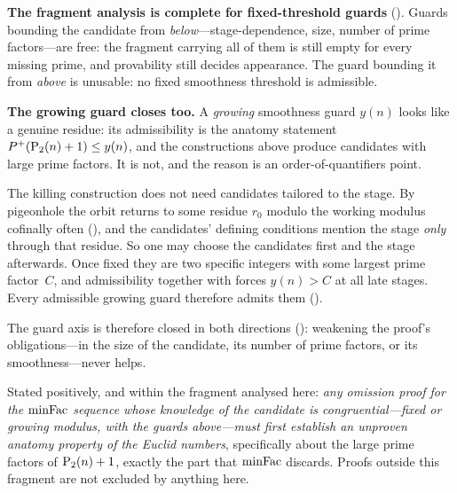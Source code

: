\begin{keyresult}
\textbf{The fragment analysis is complete for fixed-threshold guards}
().
Guards bounding the candidate from \emph{below}---stage-dependence,
size, number of prime factors---are free: the fragment carrying all of
them is still empty for every missing prime, and provability still
decides appearance.  The guard bounding it from \emph{above} is
unusable: no fixed smoothness threshold is admissible.
\end{keyresult}

\begin{frontierbox}
\textbf{The growing guard closes too.}  A \emph{growing} smoothness
guard $y(n)$ looks like a genuine residue: its admissibility is the
anatomy statement $P^{+}(\mathrm{P}_{2}(n)+1) \leq y(n)$, and the
constructions above produce candidates with large prime factors.  It is
not, and the reason is an order-of-quantifiers point.

The killing construction does not need candidates tailored to the stage.
By pigeonhole the orbit returns to some residue $r_0$ modulo the working
modulus cofinally often
(), and
the candidates' defining conditions mention the stage \emph{only}
through that residue.  So one may choose the candidates first and the
stage afterwards.  Once fixed they are two specific integers with some
largest prime factor~$C$, and admissibility together with
 forces $y(n) > C$ at all late stages.  Every
admissible growing guard therefore admits them
().

\smallskip
\noindent
The guard axis is therefore closed in both directions
(): weakening
the proof's obligations---in the size of the candidate, its number of
prime factors, or its smoothness---never helps.

\smallskip\noindent
Stated positively, and within the fragment analysed here: \emph{any
omission proof for the $\mathrm{minFac}$ sequence whose knowledge of the
candidate is congruential---fixed or growing modulus, with the guards
above---must first establish an unproven anatomy property of the Euclid
numbers}, specifically about the large prime factors of
$\mathrm{P}_{2}(n)+1$, exactly the part that $\mathrm{minFac}$ discards.  Proofs
outside this fragment are not excluded by anything here.
\end{frontierbox}

